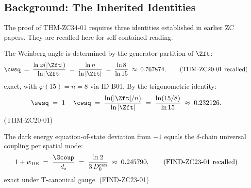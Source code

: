 \documentclass[12pt, a4paper]{article}
\begin{document}
\tableofcontents
\newpage

\subsection{Background: The Inherited Identities}
\label{sec:background}

The proof of THM-ZC34-01 requires three identities established
in earlier ZC papers. They are recalled here for self-contained
reading.

\begin{formalbox}[title={THM-ZC20-01 (recalled): Weinberg angle}]
The Weinberg angle is determined by the generator partition of
$\Zft$:
\begin{equation}
  \cwsq \;=\; \frac{\ln \varphi(|\Zft|)}{\ln |\Zft|}
        \;=\; \frac{\ln n}{\ln |\Zft|}
        \;=\; \frac{\ln 8}{\ln 15}
        \;\approx\; 0.767874,
  \tag{THM-ZC20-01 recalled}\label{eq:zc20}
\end{equation}
exact, with $\varphi(15) = n = 8$ via ID-B01. By the trigonometric
identity:
\[
  \swsq \;=\; 1 - \cwsq
         \;=\; \frac{\ln(|\Zft|/n)}{\ln|\Zft|}
         \;=\; \frac{\ln(15/8)}{\ln 15}
         \;\approx\; 0.232126.
\]
\hfill\textup{(THM-ZC20-01)}
\end{formalbox}

\begin{formalbox}[title={FIND-ZC23-01 (recalled): Dark energy
  EOS deviation}]
The dark energy equation-of-state deviation from $-1$ equals the
$\delta$-chain universal coupling per spatial mode:
\begin{equation}
  1 + w_{\rm DE} \;=\; \frac{\Gcoup}{d_s}
                \;=\; \frac{\ln 2}{3\,D_0^{\rm can}}
                \;\approx\; 0.245790,
  \tag{FIND-ZC23-01 recalled}\label{eq:zc23}
\end{equation}
exact under T-canonical gauge.
\hfill\textup{(FIND-ZC23-01)}
\end{formalbox}
\end{document}
